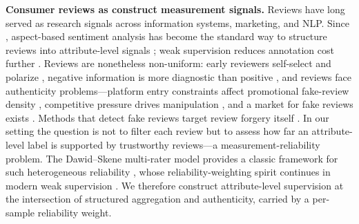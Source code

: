 \documentclass[letterpaper]{article}
\begin{document}
\textbf{Consumer reviews as construct measurement signals.} Reviews have long served as research signals across information systems, marketing, and NLP. Since \citet{hu2004mining}, aspect-based sentiment analysis has become the standard way to structure reviews into attribute-level signals \citep{pang2008opinion,liu2012sentiment}; weak supervision reduces annotation cost further \citep{angelidis2018aspect,karamanolakis2019keyword}. Reviews are nonetheless non-uniform: early reviewers self-select and polarize \citep{li2008selfselection}, negative information is more diagnostic than positive \citep{baumeister2001bad,chevalier2006wom}, and reviews face authenticity problems---platform entry constraints affect promotional fake-review density \citep{mayzlin2014promotional}, competitive pressure drives manipulation \citep{luca2016fake}, and a market for fake reviews exists \citep{he2022fakemarket}. Methods that detect fake reviews target review forgery itself \citep{jindal2008spam,mukherjee2013yelp}. In our setting the question is not to filter each review but to assess how far an attribute-level label is supported by trustworthy reviews---a measurement-reliability problem. The Dawid--Skene multi-rater model provides a classic framework for such heterogeneous reliability \citep{dawid1979em}, whose reliability-weighting spirit continues in modern weak supervision \citep{ratner2017snorkel}. We therefore construct attribute-level supervision at the intersection of structured aggregation and authenticity, carried by a per-sample reliability weight.
\end{document}
